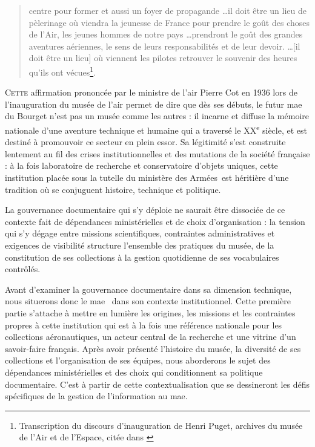 \documentclass[12pt,twoside]{book}
\newcommand{\mae}{\ac{mae}} %
\newcommand{\maelong}{\acf{mae}} %
\newcommand{\minarm}{ministère des Armées} %
\begin{document}
	
	\begin{quote}
		 centre pour former et aussi un foyer de propagande \dots il doit être un lieu de pèlerinage où viendra la jeunesse de France pour prendre le goût des choses de l’Air, les jeunes hommes de notre pays \dots prendront le goût des grandes aventures aériennes, le sens de leurs responsabilités et de leur devoir. \dots [il doit être un lieu] où viennent les pilotes retrouver le souvenir des heures qu’ils ont vécues\footnote{Transcription du discours d’inauguration de Henri Puget, archives du musée de l’Air et de l’Espace, citée dans \cite{cabaretMuseePourLaeronautique2020}}. \fg
	\end{quote}
	\medskip
	\lettrine{C}{ette} affirmation prononcée par le ministre de l'air Pierre Cot en 1936 lors de l'inauguration du musée de l'air permet de dire que dès ses débuts, le futur \maelong~ du Bourget n’est pas un musée comme les autres : il incarne et diffuse la mémoire nationale d’une aventure technique et humaine qui a traversé le XX\textsuperscript{e} siècle, et est destiné à promouvoir ce secteur en plein essor. Sa légitimité s’est construite lentement au fil des crises institutionnelles et des mutations de la société française : à la fois laboratoire de recherche et conservatoire d’objets uniques, cette institution placée sous la tutelle du \minarm~est héritière d’une tradition où se conjuguent histoire, technique et politique.
	
	
	
	La gouvernance documentaire qui s’y déploie ne saurait être dissociée de ce contexte fait de dépendances ministérielles et de choix d'organisation : la tension qui s'y dégage entre missions scientifiques, contraintes administratives et exigences de visibilité structure l’ensemble des pratiques du musée, de la constitution de ses collections à la gestion quotidienne de ses vocabulaires contrôlés.
	
	
	
	Avant d’examiner la gouvernance documentaire dans sa dimension technique, nous situerons donc le \mae~ dans son contexte institutionnel. Cette première partie s’attache à mettre en lumière les origines, les missions et les contraintes propres à cette institution qui est à la fois une référence nationale pour les collections aéronautiques, un acteur central de la recherche et une vitrine d'un savoir-faire français. Après avoir présenté l’histoire du musée, la diversité de ses collections et l'organisation de ses équipes, nous aborderons le sujet des dépendances ministérielles et des choix qui conditionnent sa politique documentaire. C'est à partir de cette contextualisation que se dessineront les défis spécifiques de la gestion de l’information au \mae.
	
\end{document}
